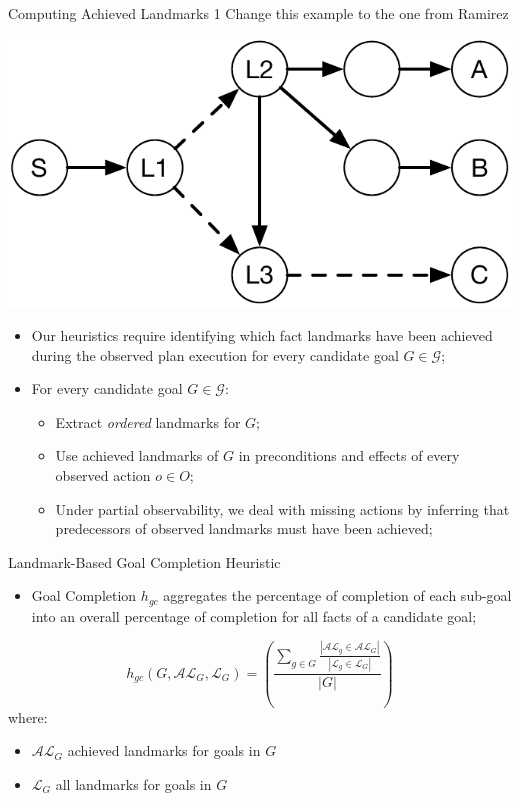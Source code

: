 \documentclass{beamer}
\newcommand{\todo}[1]{ {\color{red} #1} }
\def\masterclass{1}
\begin{document}
    \begin{frame}{Computing Achieved Landmarks}
		\if\masterclass1
		\todo{Change this example to the one from Ramirez}
		\fi
		\begin{center}
		    \includegraphics[width=.4\textwidth]{example.pdf} 
		\end{center}
		
       	\begin{itemize}
       		\item Our heuristics require identifying which fact landmarks have been achieved during the observed plan execution for every candidate goal $G \in \mathcal{G}$;
            \item For every candidate goal $G \in \mathcal{G}$:
            	\begin{itemize}
                	\item Extract \emph{ordered} landmarks for $G$;
                    \item Use achieved landmarks of $G$ in preconditions and effects of every observed action $o \in O$;
                   \item Under partial observability, we deal with missing actions by inferring that predecessors of observed landmarks must have been achieved;
                \end{itemize}
		\end{itemize}
    \end{frame}
	

    \begin{frame}{Landmark-Based Goal Completion Heuristic}
       	\begin{itemize}
       		\item Goal Completion $h_{gc}$ aggregates the percentage of completion of each sub-goal into an overall percentage of completion for all facts of a candidate goal;
		\end{itemize}
		
		\begin{equation}
			h_{gc}(G, \mathcal{AL}_{G}, \mathcal{L}_{G}) = \left(\frac{\sum_{g \in G} \frac{|\mathcal{AL}_{g} \in \mathcal{AL}_{G} |}{|\mathcal{L}_{g} \in \mathcal{L}_{G}|}}{ |G| }\right)
		\end{equation}
		where:
		\begin{itemize}
			\item $\mathcal{AL}_{G}$ achieved landmarks for goals in $G$
			\item $\mathcal{L}_{G}$ all landmarks for goals in $G$
		\end{itemize}
    \end{frame}
	
\end{document}
